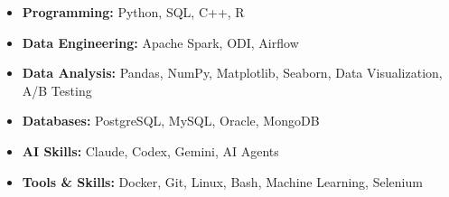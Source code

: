 \begin{itemize}[leftmargin=0.15in, label={}, itemsep=-3pt, topsep=0pt]
  \item \small{\textbf{Programming:}{ Python, SQL, C++, R}}
  \item \small{\textbf{Data Engineering:}{ Apache Spark, ODI, Airflow}}
  \item \small{\textbf{Data Analysis:}{ Pandas, NumPy, Matplotlib, Seaborn, Data Visualization, A/B Testing}}
  \item \small{\textbf{Databases:}{ PostgreSQL, MySQL, Oracle, MongoDB}}
  \item \small{\textbf{AI Skills:}{ Claude, Codex, Gemini, AI Agents}}
  \item \small{\textbf{Tools \& Skills:}{ Docker, Git, Linux, Bash, Machine Learning, Selenium}}
\end{itemize}
